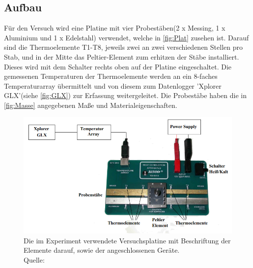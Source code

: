 \subsection{Aufbau}
\label{subsec:Aufbau}
Für den Versuch wird eine Platine mit vier Probestäben(2 x Messing, 1 x Aluminium und 1 x Edelstahl)
verwendet, welche in \autoref{fig:Plat} zusehen ist. Darauf sind die Thermoelemente T1-T8, jeweils zwei
an zwei verschiedenen Stellen pro Stab, und in der Mitte das Peltier-Element zum erhitzen der Stäbe installiert.
Dieses wird mit dem Schalter rechts oben auf der Platine eingeschaltet. Die gemessenen Temperaturen der Thermoelemente werden an ein 8-faches Temperaturarray
übermittelt und von diesem zum Datenlogger 'Xplorer GLX'(siehe \autoref{fig:GLX}) zur Erfassung weitergeleitet. Die Probestäbe haben die in \autoref{fig:Masse} angegebenen Maße und Materialeigenschaften.
\begin{figure}[H]
    \centering
    \includegraphics[scale=0.8]{content/Aufbau.png}
    \caption{Die im Experiment verwendete Versuchsplatine mit Beschriftung der Elemente darauf, sowie der angeschlossenen Geräte. \\Quelle:\cite{sample}}
    \label{fig:Plat}
\end{figure}
